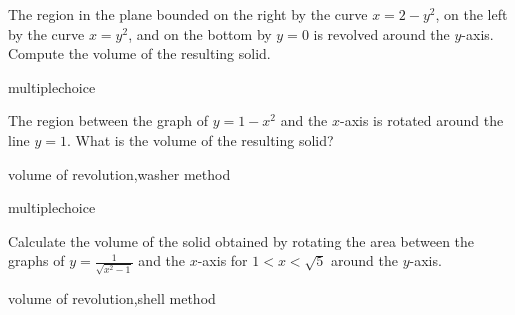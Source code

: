 \documentclass{ximera}
\begin{document}
\begin{question}
 The region in the plane bounded on the right by the curve $x = 2 - y^2$, on the left by the curve $x = y^2$, and on the bottom by $y = 0$ is revolved around the $y$-axis. Compute the volume of the resulting solid.
\begin{multipleChoice}
\end{multipleChoice}
\end{question}

\begin{question}[2015C.14]
\begin{type}
multiplechoice
\end{type}
The region between the graph of \(y = 1-x^2\) and the \(x\)-axis is rotated around the line \(y=1\). What is the volume of the resulting solid?
\begin{multiplechoice}
\choice{\(2 \pi\)}
\end{multiplechoice}
\begin{keywords}
volume of revolution,washer method
\end{keywords}
\end{question}


\begin{question}[2015C.15]
\begin{type}
multiplechoice
\end{type}
Calculate the volume of the solid obtained by rotating the area between the graphs of \(\displaystyle y = \frac{1}{\sqrt{x^2-1}}\) and the \(x\)-axis for \(1 < x < \sqrt{5}\) around the \(y\)-axis.
\begin{multiplechoice}
\choice{\(\pi\)}
\choice[correct]{\(4 \pi\)}
\choice{\(6 \pi\)}
\choice{\(8 \pi\)}
\choice{\(3 \pi\)}
\choice{\(2 \pi\)}
\end{multiplechoice}
\begin{keywords}
volume of revolution,shell method
\end{keywords}
\end{question}
\end{document}
